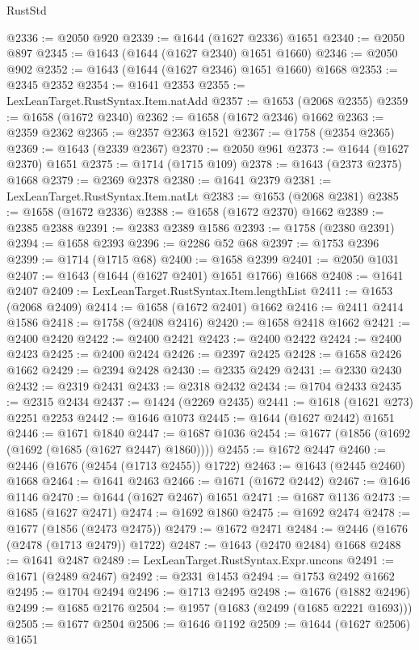 \begin{lexlean}{RustStd}
\begin{coremodule}
@2336 := @2050 @920
@2339 := @1644 (@1627 @2336) @1651
@2340 := @2050 @897
@2345 := @1643 (@1644 (@1627 @2340) @1651 @1660)
@2346 := @2050 @902
@2352 := @1643 (@1644 (@1627 @2346) @1651 @1660) @1668
@2353 := @2345 @2352
@2354 := @1641 @2353
@2355 := LexLeanTarget.RustSyntax.Item.natAdd
@2357 := @1653 (@2068 @2355)
@2359 := @1658 (@1672 @2340)
@2362 := @1658 (@1672 @2346) @1662
@2363 := @2359 @2362
@2365 := @2357 @2363 @1521
@2367 := @1758 (@2354 @2365)
@2369 := @1643 (@2339 @2367)
@2370 := @2050 @961
@2373 := @1644 (@1627 @2370) @1651
@2375 := @1714 (@1715 @109)
@2378 := @1643 (@2373 @2375) @1668
@2379 := @2369 @2378
@2380 := @1641 @2379
@2381 := LexLeanTarget.RustSyntax.Item.natLt
@2383 := @1653 (@2068 @2381)
@2385 := @1658 (@1672 @2336)
@2388 := @1658 (@1672 @2370) @1662
@2389 := @2385 @2388
@2391 := @2383 @2389 @1586
@2393 := @1758 (@2380 @2391)
@2394 := @1658 @2393
@2396 := @2286 @52 @68
@2397 := @1753 @2396
@2399 := @1714 (@1715 @68)
@2400 := @1658 @2399
@2401 := @2050 @1031
@2407 := @1643 (@1644 (@1627 @2401) @1651 @1766) @1668
@2408 := @1641 @2407
@2409 := LexLeanTarget.RustSyntax.Item.lengthList
@2411 := @1653 (@2068 @2409)
@2414 := @1658 (@1672 @2401) @1662
@2416 := @2411 @2414 @1586
@2418 := @1758 (@2408 @2416)
@2420 := @1658 @2418 @1662
@2421 := @2400 @2420
@2422 := @2400 @2421
@2423 := @2400 @2422
@2424 := @2400 @2423
@2425 := @2400 @2424
@2426 := @2397 @2425
@2428 := @1658 @2426 @1662
@2429 := @2394 @2428
@2430 := @2335 @2429
@2431 := @2330 @2430
@2432 := @2319 @2431
@2433 := @2318 @2432
@2434 := @1704 @2433
@2435 := @2315 @2434
@2437 := @1424 (@2269 @2435)
@2441 := @1618 (@1621 @273) @2251 @2253
@2442 := @1646 @1073
@2445 := @1644 (@1627 @2442) @1651
@2446 := @1671 @1840
@2447 := @1687 @1036
@2454 := @1677 (@1856 (@1692 (@1692 (@1685 (@1627 @2447) @1860))))
@2455 := @1672 @2447
@2460 := @2446 (@1676 (@2454 (@1713 @2455)) @1722)
@2463 := @1643 (@2445 @2460) @1668
@2464 := @1641 @2463
@2466 := @1671 (@1672 @2442)
@2467 := @1646 @1146
@2470 := @1644 (@1627 @2467) @1651
@2471 := @1687 @1136
@2473 := @1685 (@1627 @2471)
@2474 := @1692 @1860
@2475 := @1692 @2474
@2478 := @1677 (@1856 (@2473 @2475))
@2479 := @1672 @2471
@2484 := @2446 (@1676 (@2478 (@1713 @2479)) @1722)
@2487 := @1643 (@2470 @2484) @1668
@2488 := @1641 @2487
@2489 := LexLeanTarget.RustSyntax.Expr.uncons
@2491 := @1671 (@2489 @2467)
@2492 := @2331 @1453
@2494 := @1753 @2492 @1662
@2495 := @1704 @2494
@2496 := @1713 @2495
@2498 := @1676 (@1882 @2496)
@2499 := @1685 @2176
@2504 := @1957 (@1683 (@2499 (@1685 @2221 @1693)))
@2505 := @1677 @2504
@2506 := @1646 @1192
@2509 := @1644 (@1627 @2506) @1651

\end{coremodule}
\end{lexlean}
